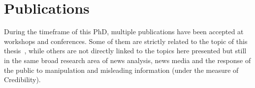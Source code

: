 





\section{\statusgreen Publications}
\label{sec:intro_publications}

During the timeframe of this PhD, multiple publications have been accepted at workshops and conferences. Some of them are strictly related to the topic of this thesis~\citep{mensio2020towards}, while others are not directly linked to the topics here presented but still in the same broad research area of news analysis, news media and the response of the public to manipulation and misleading information (under the measure of Credibility).





